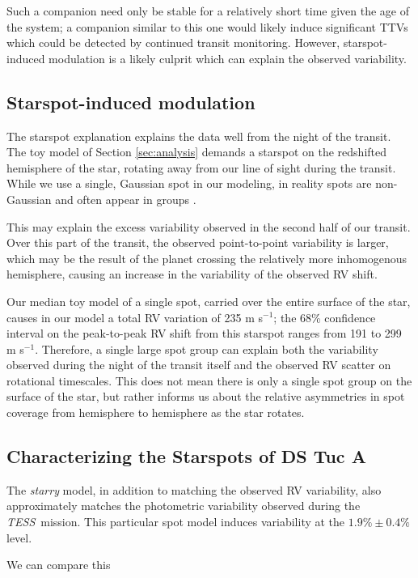 \documentclass[twocolumn]{aastex63}
\newcommand{\tess}{{\it TESS}}
\begin{document}
Such a companion need only be stable for a relatively short time given the age of the system; a companion similar to this one would likely induce significant TTVs which could be detected by continued transit monitoring.
However, starspot-induced modulation is a likely culprit which can explain the observed variability.


\subsection{Starspot-induced modulation}

The starspot explanation explains the data well from the night of the transit.
The toy model of Section \ref{sec:analysis} demands a starspot on the redshifted hemisphere of the star, rotating away from our line of sight during the transit. 
While we use a single, Gaussian spot in our modeling, in reality spots are non-Gaussian and often appear in groups \citep[e.g.][]{Kilcik11}.

This may explain the excess variability observed in the second half of our transit. 
Over this part of the transit, the observed point-to-point variability is larger, which may be the result of the planet crossing the relatively more inhomogenous hemisphere, causing an increase in the variability of the observed RV shift.

Our median toy model of a single spot, carried over the entire surface of the star, causes in our model a total RV variation of 235 m s$^{-1}$; the 68\% confidence interval on the peak-to-peak RV shift from this starspot ranges from 191 to 299 m s$^{-1}$.
Therefore, a single large spot group can explain both the variability observed during the night of the transit itself and the observed RV scatter on rotational timescales.
This does not mean there is only a single spot group on the surface of the star, but rather informs us about the relative asymmetries in spot coverage from hemisphere to hemisphere as the star rotates.


\subsection{Characterizing the Starspots of DS Tuc A}
The \textit{starry} model, in addition to matching the observed RV variability, also approximately matches the photometric variability observed during the \tess\ mission. 
This particular spot model induces variability at the $1.9\% \pm 0.4\%$ level.

We can compare this 
\end{document}
